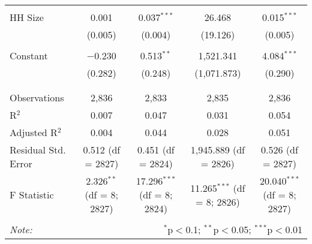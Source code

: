 \begin{table}[!htbp]
\begin{tabular}{@{\extracolsep{5pt}}lcccc}
  & & & & \\ 
 HH Size & 0.001 & 0.037$^{***}$ & 26.468 & 0.015$^{***}$ \\ 
  & (0.005) & (0.004) & (19.126) & (0.005) \\ 
  & & & & \\ 
 Constant & $-$0.230 & 0.513$^{**}$ & 1,521.341 & 4.084$^{***}$ \\ 
  & (0.282) & (0.248) & (1,071.873) & (0.290) \\ 
  & & & & \\ 
\hline \\[-1.8ex] 
Observations & 2,836 & 2,833 & 2,835 & 2,836 \\ 
R$^{2}$ & 0.007 & 0.047 & 0.031 & 0.054 \\ 
Adjusted R$^{2}$ & 0.004 & 0.044 & 0.028 & 0.051 \\ 
Residual Std. Error & 0.512 (df = 2827) & 0.451 (df = 2824) & 1,945.889 (df = 2826) & 0.526 (df = 2827) \\ 
F Statistic & 2.326$^{**}$ (df = 8; 2827) & 17.296$^{***}$ (df = 8; 2824) & 11.265$^{***}$ (df = 8; 2826) & 20.040$^{***}$ (df = 8; 2827) \\ 
\hline 
\hline \\[-1.8ex] 
\textit{Note:}  & \multicolumn{4}{r}{$^{*}$p$<$0.1; $^{**}$p$<$0.05; $^{***}$p$<$0.01} \\ 
\end{tabular} 
\end{table} 
